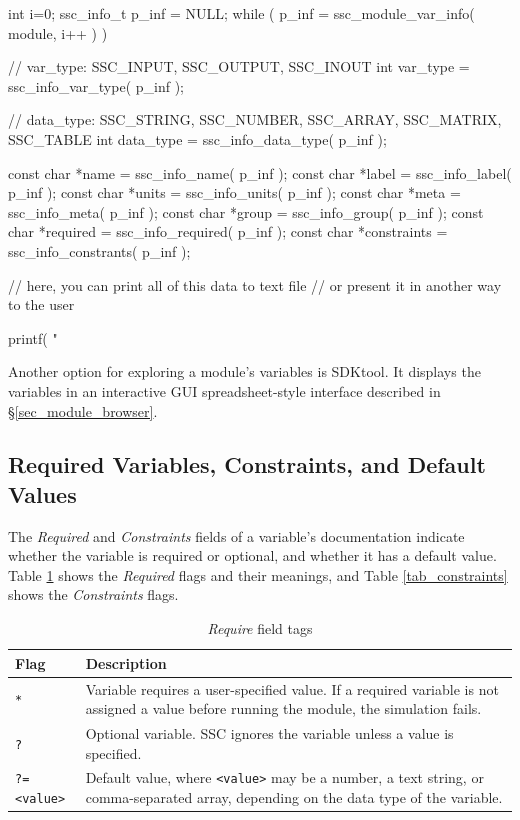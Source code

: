 \documentclass{scrartcl} %
\begin{document}
\begin{verbatimtab}[4]
int i=0;
ssc_info_t p_inf = NULL;
while ( p_inf = ssc_module_var_info( module, i++ ) )
{
	// var_type: SSC_INPUT, SSC_OUTPUT, SSC_INOUT
	int var_type = ssc_info_var_type( p_inf );

	// data_type: SSC_STRING, SSC_NUMBER, SSC_ARRAY, SSC_MATRIX, SSC_TABLE   
	int data_type = ssc_info_data_type( p_inf );
      
	const char *name = ssc_info_name( p_inf );
	const char *label = ssc_info_label( p_inf );
	const char *units = ssc_info_units( p_inf );
	const char *meta = ssc_info_meta( p_inf );
	const char *group = ssc_info_group( p_inf );
	const char *required = ssc_info_required( p_inf );
	const char *constraints = ssc_info_constrants( p_inf );

	// here, you can print all of this data to text file
	// or present it in another way to the user

	printf( "%
}

\end{verbatimtab}

Another option for exploring a module's variables is SDKtool. It displays the variables in an interactive GUI spreadsheet-style interface described in \S\ref{sec_module_browser}.

\subsection{Required Variables, Constraints, and Default Values}
\label{sec_def_const}

The \emph{Required} and \emph{Constraints} fields of a variable's documentation indicate whether the variable is required or optional, and whether it has a default value. Table \ref{tab_required} shows the \emph{Required} flags and their meanings, and Table \ref{tab_constraints} shows the \emph{Constraints} flags. 

\begin{table}[ht]
\begin{center}
\begin{tabular}{p{0.75in}p{4.75in}}
Flag & Description\\
\hline
\texttt{*} &  Variable requires a user-specified value. If a required variable is not assigned a value before running the module, the simulation fails.\\
\texttt{?} & Optional variable. SSC ignores the variable unless a value is specified.\\
\texttt{?=<value>} & Default value, where \texttt{<value>} may be a number, a text string, or comma-separated array, depending on the data type of the variable.\\
\end{tabular}
\caption{\emph{Require} field tags}
\label{tab_required}
\end{center}
\end{table}
\end{document}
